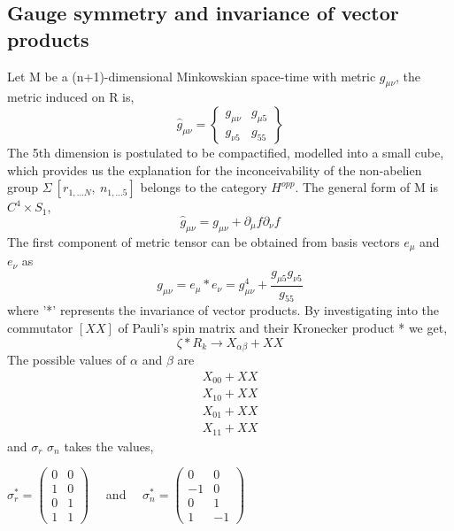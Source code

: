\documentclass{article}
\begin{document}
\subsection{Gauge symmetry and invariance of vector products}
Let M be a (n+1)-dimensional Minkowskian space-time with metric $g_{\mu \nu}$, the metric induced on R is,
\begin{equation}
  \hat g_{\mu \nu} =
    \begin{Bmatrix}

      g_{\mu \nu} & g_{\mu 5}\\
      g_{\nu 5} & g_{5 5}
    \end{Bmatrix}
\end{equation}
 The 5th dimension is postulated to be compactified, modelled into a small cube, which provides us the explanation for the inconceivability of the non-abelien group 
 \begin{math}
 \Sigma \ [r_{1, \dots N},\ n_{1, \dots 5}] 
 \end{math} belongs to the category $H^{opp}$.  The general form of M is $C^4 \times S_1$,
 \begin{equation}
 \hat g_{\mu \nu} = g_{\mu \nu} + \partial_\mu f \partial_\nu f 
 \end{equation}
The first component of metric tensor can be obtained from basis vectors $e_\mu$ and $e_\nu$ as
\begin{equation}
   g_{\mu \nu} =  e_\mu * e_\nu = g_{\mu \nu}^4 + \frac{g_{\mu 5}g_{\nu 5} }{g_{5 5}} 
\end{equation} where '*' represents the invariance of vector products. By investigating into the commutator $[XX]$ of Pauli's spin matrix and their Kronecker product * we get,
\begin{equation}
     \zeta * R_k \rightarrow X_{\alpha \beta} + XX 
\end{equation} The possible values of $\alpha$ and $\beta$ are
\begin{gather*}
      X_{0 0} + XX \\
    X_{1 0} + XX \\
   X_{0 1} + XX \\
   X_{1 1} + XX 
\end{gather*}
 and $\sigma_r$ $\sigma_n$ takes the values,
 \begin{center}
 \begin{math}
 \sigma_r^* =
 \left(\begin{matrix}
0 & 0 \\
1 & 0 \\
0 & 1 \\
1 & 1 
\end{matrix}\right)
\end{math} \ \ and \ \ \begin{math}
\sigma_n^* =
\left(\begin{matrix}
0 &  0 \\
-1 & 0 \\
0 &  1 \\
1 & -1
\end{matrix}\right)
\end{math}
\end{center}
\end{document}
